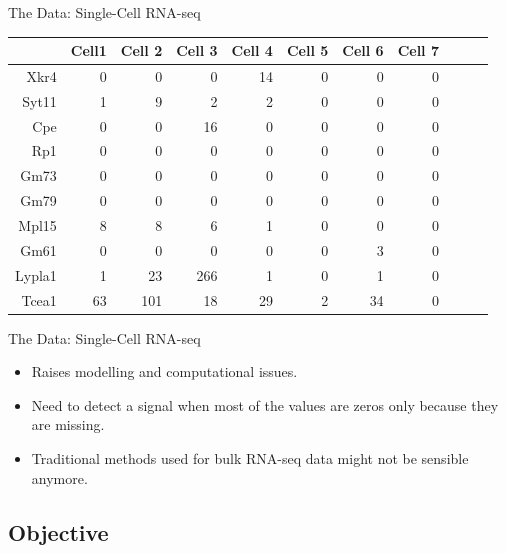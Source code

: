 \documentclass{beamer}
\begin{document}

\begin{frame}{The Data: Single-Cell RNA-seq}

\begin{table}[ht]
\centering
\begin{tabular}{rrrrrrrrrrr}
  \hline
 & Cell1 & Cell 2 & Cell 3 & Cell 4 & Cell 5 & Cell 6 & Cell 7  \\ 
  \hline
Xkr4 & 0 & 0 & 0 & 14 & 0 & 0 & 0  \\ 
  Syt11 & 1 & 9 & 2 & 2 & 0 & 0 & 0  \\ 
  Cpe & 0 & 0 & 16 & 0 & 0 & 0 & 0  \\ 
  Rp1 & 0 & 0 & 0 & 0 & 0 & 0 & 0  \\ 
  Gm73 & 0 & 0 & 0 & 0 & 0 & 0 & 0  \\ 
  Gm79 & 0 & 0 & 0 & 0 & 0 & 0 & 0  \\ 
  Mpl15 & 8 & 8 & 6 & 1 & 0 & 0 & 0  \\ 
  Gm61 & 0 & 0 & 0 & 0 & 0 & 3 & 0 \\ 
  Lypla1 & 1 & 23 & 266 & 1 & 0 & 1 & 0 \\ 
  Tcea1 & 63 & 101 & 18 & 29 & 2 & 34 & 0  \\ 
   \hline
\end{tabular}
\end{table}

\end{frame}

\begin{frame}{The Data: Single-Cell RNA-seq}

\begin{itemize}
  \itemsep10pt
  \item Raises modelling and computational issues.
  \item Need to detect a signal when most of the values are zeros only because they are missing.
  \item Traditional methods used for bulk RNA-seq data might not  be sensible anymore.
\end{itemize}

\end{frame}

\subsection{Objective}
\end{document}
